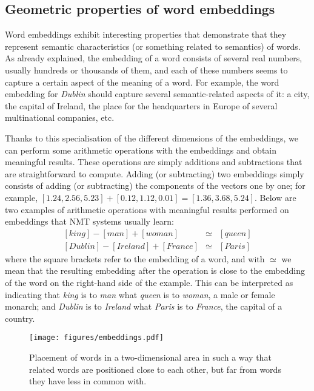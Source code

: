 \documentclass[output=paper,colorlinks,citecolor=brown]{langscibook}
\begin{document}
\subsection{Geometric properties of word embeddings}

Word embeddings exhibit interesting properties that demonstrate that they represent semantic characteristics (or something related to semantics) of words. As already explained, the embedding of a word consists of several real numbers, usually hundreds or thousands of them, and each of these numbers seems to capture a certain aspect of the meaning of a word. For example, the word embedding for \emph{Dublin} should capture several semantic-related aspects of it: a city, the capital of Ireland, the place for the headquarters in Europe of several multinational companies, etc.

Thanks to this specialisation 
of the different dimensions of the embeddings, we can perform some arithmetic operations with the embeddings and obtain meaningful results. These operations are simply additions and subtractions that are straightforward to compute. Adding (or subtracting) two embeddings simply consists of adding (or subtracting) the components of the vectors one by one; for example,  $[1.24,2.56,5.23]+[0.12,1.12,0.01]=[1.36,3.68,5.24]$.
Below are two examples of arithmetic operations with meaningful results performed on embeddings that NMT systems usually learn:
\begin{eqnarray*}
\mathit{[king]}-\mathit{[man]}+\mathit{[woman]} &\simeq & \mathit{[queen]} \\
\mathit{[Dublin]}-\mathit{[Ireland]}+\mathit{[France]} & \simeq & \mathit{[Paris]}
\end{eqnarray*}
where the square brackets refer to the embedding of a word, and with $\simeq$ we mean that the resulting embedding after the operation is close to the embedding of the word on the right-hand side of the example. This can be interpreted as indicating that \emph{king} is to \emph{man} what  \emph{queen} is to \emph{woman}, a male or female monarch; and \emph{Dublin} is to \emph{Ireland} what \emph{Paris} is to \emph{France}, the capital of a country.

\begin{figure}[tb]
\texttt{[image: figures/embeddings.pdf]}
\caption{Placement of words in a two-dimensional area in such a way that related words are positioned close to each other, but far from words they have less in common with.}
\label{fg:2dwordembedding}
\end{figure}
\end{document}
